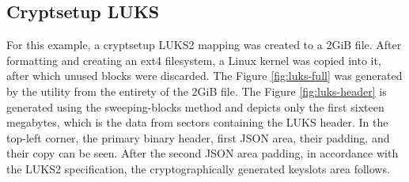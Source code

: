 \documentclass[
  digital, %
  color,   %
  oneside, %
  lof,     %
  nolot,     %
]{fithesis4}
\begin{document}
\subsection{Cryptsetup LUKS}
\label{ssec:cryptsetup-luks}


For this example, a cryptsetup LUKS2 mapping was created to a 2GiB file.
After formatting and creating an ext4 filesystem, a Linux kernel was copied into it, after which unused blocks were discarded.
The Figure \ref{fig:luks-full} was generated by the utility from the entirety of the 2GiB file.
The Figure \ref{fig:luks-header} is generated using the sweeping-blocks method and depicts only the first sixteen megabytes, which is the data from sectors containing the LUKS header.
In the top-left corner, the primary binary header, first JSON area, their padding, and their copy can be seen.
After the second JSON area padding, in accordance with the LUKS2 specification, the cryptographically generated keyslots area follows.\cite{broz22}
\end{document}
